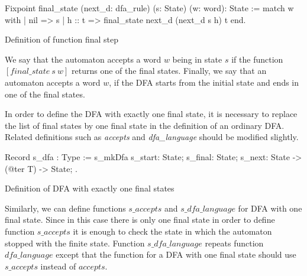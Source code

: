 \begin{listing}[h]
    \begin{pyglist}[language=coq, numbers=none, numbersep=5pt]
  Fixpoint final_state 
             (next_d: dfa_rule) 
             (s: State) 
             (w: word): State :=
    match w with
    | nil => s 
    | h :: t => final_state next_d 
                            (next_d s h)
                            t 
    end.
    \end{pyglist}
    \caption{Definition of function final step}
    \label{lst:verbments1}
\end{listing}

We say that the automaton accepts a word $w$ being in state $s$ if the function $[\textit{final\_state} \ s \ w]$ returns one of the final states.
Finally, we say that an automaton accepts a word $w$, if the DFA starts from the initial state and ends in one of the final states.



In order to define the DFA with exactly one final state, it is necessary to replace the list of final states by one final state in the definition of an ordinary DFA. 
Related definitions such as \textit{accepts} and \textit{dfa\_language} should be modified slightly.


\begin{listing}[h]
    \begin{pyglist}[language=coq, numbers=none, numbersep=5pt]
  Record s_dfa : Type :=
    s_mkDfa {
      s_start: State;
      s_final: State;
      s_next: State -> (@ter T) -> State;
  }.      
    \end{pyglist}
    \caption{Definition of DFA with exactly one final states}
    \label{lst:dfa-one-ss}
\end{listing}
  
Similarly, we can define functions $\textit{s\_accepts}$ and $\textit{s\_dfa\_language}$ for DFA with one final state.
Since in this case there is only one final state in order to define function $\textit{s\_accepts}$ it is enough to check the state in which the automaton stopped with the finite state. Function $\textit{s\_dfa\_language}$ repeats function $\textit{dfa\_language}$ except that the function for a DFA with one final state should use $\textit{s\_accepts}$ instead of $\textit{accepts}$.

